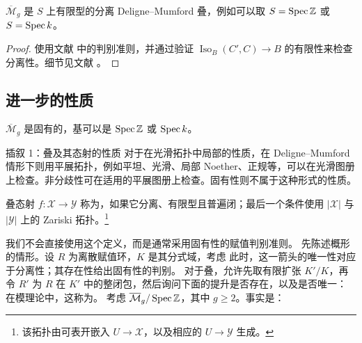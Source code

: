 \begin{corollary}\label{cor:2.11}
$\overline{\mathcal M}_g$ 是 $S$ 上有限型的分离 Deligne–Mumford 叠，例如可以取 $S=\operatorname{Spec}\mathbb Z$ 或 $S=\operatorname{Spec} k$。
\end{corollary}
\begin{proof}
使用文献 \cite{ref8} 中的判别准则，并通过验证 $\operatorname{Iso}_B(C',C)\to B$ 的有限性来检查分离性。细节见文献 \cite{ref8}。
\end{proof}
\subsection{进一步的性质}
\begin{proposition}\label{pro:2.12}
$\overline{\mathcal M}_g$ 是固有的，基可以是 $\operatorname{Spec}\mathbb Z$ 或 $\operatorname{Spec} k$。
\end{proposition}
\begin{custom}{插叙 1：叠及其态射的性质}\hypertarget{digression:2.1}{}
对于在光滑拓扑中局部的性质，在 Deligne–Mumford 情形下则用平展拓扑，例如平坦、光滑、局部 Noether、正规等，可以在光滑图册上检查。非分歧性可在适用的平展图册上检查。固有性则不属于这种形式的性质。
\end{custom}
\begin{definition}\label{def:2.12}
叠态射 $f:\mathcal X\to\mathcal Y$ 称为，如果它分离、有限型且普遍闭；最后一个条件使用 $|\mathcal X|$ 与 $|\mathcal Y|$ 上的 Zariski 拓扑。\footnote{该拓扑由可表开嵌入 $U\to\mathcal X$，以及相应的 $U\to\mathcal Y$ 生成。}
\end{definition}
我们不会直接使用这个定义，而是通常采用固有性的赋值判别准则。
先陈述概形的情形。设 $R$ 为离散赋值环，$K$ 是其分式域，考虑
此时，这一箭头的唯一性对应于分离性；其存在性给出固有性的判别。
对于叠，允许先取有限扩张 $K'/K$，再令 $R'$ 为 $R$ 在 $K'$ 中的整闭包，然后询问下面的提升是否存在，以及是否唯一：
在模理论中，这称为。
考虑 $\overline{\mathcal M}_g/\operatorname{Spec}\mathbb Z$，其中 $g\ge2$。事实是：
